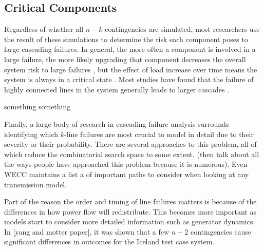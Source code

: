 \subsection{Critical Components}
Regardless of whether all $n-k$ contingencies are simulated, most researchers use the result of these simulations to determine the risk each component poses to large cascading failures.  In general, the more often a component is involved in a large failure, the more likely upgrading that component decreases the overall system risk to large failures \cite{random_chemistry2}, but the effect of load increase over time means the system is always in a critical state \cite{Newman2008}.  Most studies have found that the failure of highly connected lines in the system generally leads to larger cascades \cite{Kornbluth2018}\cite{YangCoSep}\cite{YangMotterSVS}.  

something something


Finally, a large body of research in cascading failure analysis surrounds identifying which $k$-line failures are most crucial to model in detail due to their severity or their probability.  There are several approaches to this problem, all of which reduce the combinatorial search space to some extent.  (then talk about all the ways people have approached this problem because it is numerous).  Even WECC maintains a list a of important paths to consider when looking at any transmission model.

Part of the reason the order and timing of line failures matters is because of the differences in how power flow will redistribute.  This becomes more important as models start to consider more detailed information such as generator dynamics.  In [yang and motter paper], it was shown that a few $n-2$ contingencies cause significant differences in outcomes for the Iceland test case system.  









